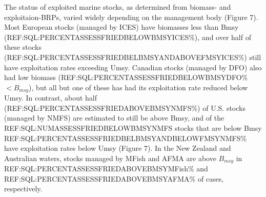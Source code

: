 The status of exploited marine stocks, as determined from biomass- and
exploitaion-BRPs, varied widely depending on the management body
(Figure 7). Most European stocks (managed by ICES) have biomasses less
than Bmsy (REF:SQL:PERCENTASSESSFRIEDBELOWBMSYICES\%), and over half
of these stocks (REF:SQL:PERCENTASSESSFRIEDBELBMSYANDABOVEFMSYICES\%)
still have exploitation rates exceeding Umsy. Canadian stocks (managed
by DFO) also had low biomass (REF:SQL:PERCENTASSESSFRIEDBELOWBMSYDFO\%
$< B_{msy}$), but all but one of these has had its exploitation rate
reduced below Umsy. In contrast, about half
(REF:SQL:PERCENTASSESSFRIEDABOVEBMSYNMFS\%) of U.S. stocks (managed by
NMFS) are estimated to still be above Bmsy, and of the
REF:SQL:NUMASSESSFRIEDBELOWBMSYNMFS stocks that are below Bmsy
REF:SQL:PERCENTASSESSFRIEDBELBMSYANDBELOWFMSYNMFS\% have exploitation
rates below Umsy (Figure 7). In the New Zealand and Australian waters,
stocks managed by MFish and AFMA are above $B_{msy}$ in
REF:SQL:PERCENTASSESSFRIEDABOVEBMSYMFish\% and
REF:SQL:PERCENTASSESSFRIEDABOVEBMSYAFMA\% of cases, respectively.





 

